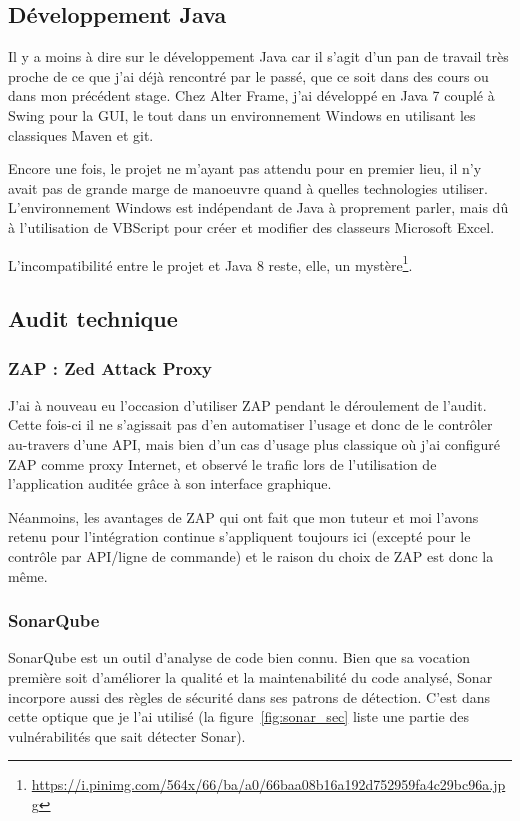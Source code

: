 \subsection{Développement Java}
Il y a moins à dire sur le développement Java car il s'agit d'un pan de travail très proche de ce que j'ai déjà rencontré par le passé, que ce soit dans des cours ou dans mon précédent stage. Chez Alter Frame, j'ai développé en Java 7 couplé à Swing pour la GUI, le tout dans un environnement Windows en utilisant les classiques Maven et git.

Encore une fois, le projet ne m'ayant pas attendu pour en premier lieu, il n'y avait pas de grande marge de manoeuvre quand à quelles technologies utiliser. L'environnement Windows est indépendant de Java à proprement parler, mais dû à l'utilisation de VBScript pour créer et modifier des classeurs Microsoft Excel.

L'incompatibilité entre le projet et Java 8 reste, elle, un mystère\footnote{\url{https://i.pinimg.com/564x/66/ba/a0/66baa08b16a192d752959fa4c29bc96a.jpg}}.

\subsection{Audit technique}
\subsubsection{ZAP : Zed Attack Proxy}
J'ai à nouveau eu l'occasion d'utiliser ZAP pendant le déroulement de l'audit. Cette fois-ci il ne s'agissait pas d'en automatiser l'usage et donc de le contrôler au-travers d'une API, mais bien d'un cas d'usage plus classique où j'ai configuré ZAP comme proxy Internet, et observé le trafic lors de l'utilisation de l'application auditée grâce à son interface graphique.

Néanmoins, les avantages de ZAP qui ont fait que mon tuteur et moi l'avons retenu pour l'intégration continue s'appliquent toujours ici (excepté pour le contrôle par API/ligne de commande) et le raison du choix de ZAP est donc la même.

\subsubsection{SonarQube}
SonarQube est un outil d'analyse de code bien connu. Bien que sa vocation première soit d'améliorer la qualité et la maintenabilité du code analysé, Sonar incorpore aussi des règles de sécurité dans ses patrons de détection. C'est dans cette optique que je l'ai utilisé (la figure~\ref{fig:sonar_sec} liste une partie des vulnérabilités que sait détecter Sonar).

